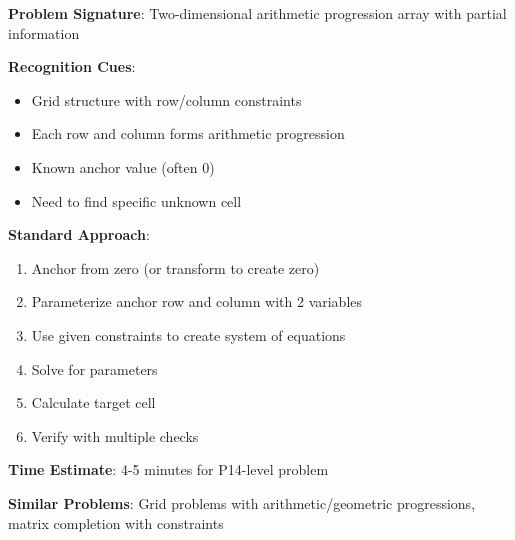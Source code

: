 \documentclass[12pt]{article}
\begin{document}
\textbf{Problem Signature}: Two-dimensional arithmetic progression array with partial information

\textbf{Recognition Cues}:
\begin{itemize}
    \item Grid structure with row/column constraints
    \item Each row and column forms arithmetic progression
    \item Known anchor value (often 0)
    \item Need to find specific unknown cell
\end{itemize}

\textbf{Standard Approach}:
\begin{enumerate}
    \item Anchor from zero (or transform to create zero)
    \item Parameterize anchor row and column with 2 variables
    \item Use given constraints to create system of equations
    \item Solve for parameters
    \item Calculate target cell
    \item Verify with multiple checks
\end{enumerate}

\textbf{Time Estimate}: 4-5 minutes for P14-level problem

\textbf{Similar Problems}: Grid problems with arithmetic/geometric progressions, matrix completion with constraints
\end{document}
